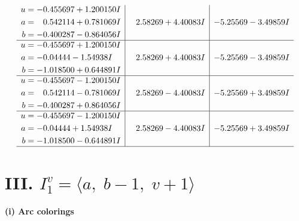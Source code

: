 \documentclass[1p]{elsarticle_modified}
\theoremstyle{definition}
\begin{document}
$$\begin{array}{c|c|c}
\begin{aligned}
u &= -0.455697 + 1.200150 I \\
a &= \phantom{-}0.542114 + 0.781069 I \\
b &= -0.400287 - 0.864056 I\end{aligned}
 & \phantom{-}2.58269 + 4.40083 I & -5.25569 - 3.49859 I \\ \hline\begin{aligned}
u &= -0.455697 + 1.200150 I \\
a &= -0.04444 - 1.54938 I \\
b &= -1.018500 + 0.644891 I\end{aligned}
 & \phantom{-}2.58269 + 4.40083 I & -5.25569 - 3.49859 I \\ \hline\begin{aligned}
u &= -0.455697 - 1.200150 I \\
a &= \phantom{-}0.542114 - 0.781069 I \\
b &= -0.400287 + 0.864056 I\end{aligned}
 & \phantom{-}2.58269 - 4.40083 I & -5.25569 + 3.49859 I \\ \hline\begin{aligned}
u &= -0.455697 - 1.200150 I \\
a &= -0.04444 + 1.54938 I \\
b &= -1.018500 - 0.644891 I\end{aligned}
 & \phantom{-}2.58269 - 4.40083 I & -5.25569 + 3.49859 I\\
 \hline 
 \end{array}$$\newpage\newpage\renewcommand{\arraystretch}{1}
\centering \section*{III. $I^v_{1}= \langle a,\;b-1,\;v+1 \rangle$}
\flushleft \textbf{(i) Arc colorings}\\
\end{document}
